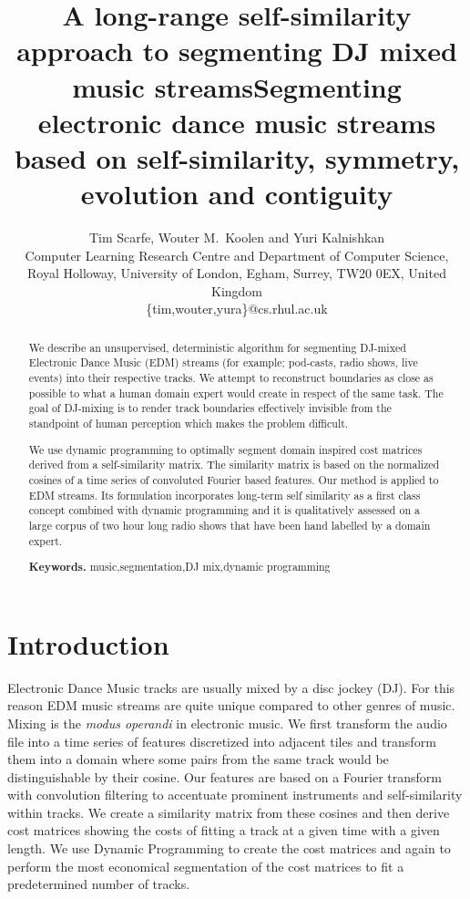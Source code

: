 \documentclass[twocolumn]{article}
\title{
	A long-range self-similarity approach to segmenting DJ mixed music streams}
\author{Tim Scarfe, Wouter M.~Koolen and Yuri Kalnishkan \\ 
	Computer Learning Research
	Centre and Department of Computer Science, \\ 
	Royal Holloway,  University of London, Egham, Surrey, TW20 0EX, United Kingdom\\
	\{tim,wouter,yura\}@cs.rhul.ac.uk
}
\title{Segmenting electronic dance music streams based on self-similarity, symmetry, evolution and contiguity}
\begin{document}
	
	\maketitle
	
	\begin{abstract}
		
		We describe an unsupervised, deterministic algorithm for segmenting DJ-mixed Electronic Dance Music (EDM) streams (for example; pod-casts, radio shows, live events) into their respective tracks. We attempt to reconstruct boundaries as close as possible to what a human domain expert would create in respect of the same task. The goal of DJ-mixing is to render track boundaries effectively invisible from the standpoint of human perception which makes the problem difficult.
		
		We use dynamic programming to optimally segment domain inspired cost matrices derived from a self-similarity matrix. The similarity matrix is based on the normalized cosines of a time series of convoluted Fourier based features. Our method is applied to EDM streams. Its formulation incorporates long-term self similarity as a first class concept combined with dynamic programming and it is qualitatively assessed on a large corpus of two hour long radio shows that have been hand labelled by a domain expert.
		\smallskip
		
		\noindent \textbf{Keywords.} \noindent music,segmentation,DJ mix,dynamic programming
		
	\end{abstract}
	
	
	\vspace{1em}
	
	\section{Introduction}
	
	Electronic Dance Music tracks are usually mixed by a disc jockey (DJ). For this reason EDM music streams are quite unique compared to other genres of music. Mixing is the \textit{modus operandi} in electronic music. We first transform the audio file into a time series of features discretized into adjacent tiles and transform them into a domain where some pairs from the same track would be distinguishable by their cosine. Our features are based on a Fourier transform with convolution filtering to accentuate prominent instruments and self-similarity within tracks. We create a similarity matrix from these cosines and then derive cost matrices showing the costs of fitting a track at a given time with a given length. We use Dynamic Programming to create the cost matrices and again to perform the most economical segmentation of the cost matrices to fit a predetermined number of tracks.
	
\end{document}
